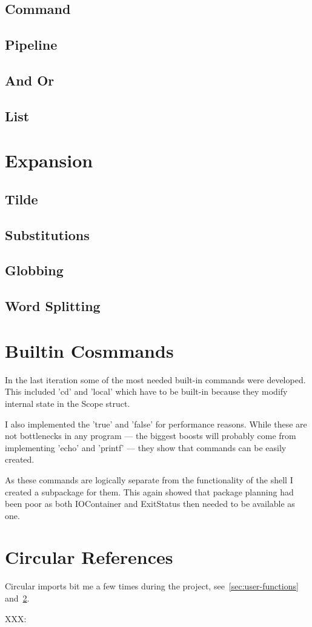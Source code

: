 \subsection{Command}
\subsection{Pipeline}
\subsection{And Or}
\subsection{List}

\section{Expansion}

\subsection{Tilde}
\subsection{Substitutions}
\subsection{Globbing}
\subsection{Word Splitting}

\section{Builtin Cosmmands}
\label{sec:builtins}
In the last iteration some of the most needed built-in commands were developed.
This included 'cd' and 'local' which have to be built-in because they modify internal state in the Scope struct. 

I also implemented the 'true' and 'false' for performance reasons.
While these are not bottlenecks in any program --- the biggest boosts will probably come from implementing 'echo' and 'printf' --- they show that commands can be easily created.

As these commands are logically separate from the functionality of the shell I created a subpackage for them.
This again showed that package planning had been poor as both IOContainer and ExitStatus then needed to be available as one.

\section{Circular References}
\label{sec:circular-refs}
Circular imports bit me a few times during the project, see~\ref{sec:user-functions} and~\ref{sec:builtins}.




XXX: %